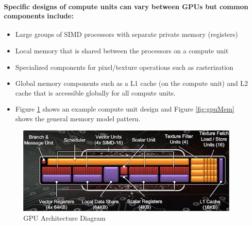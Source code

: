 \documentclass[a4paper,10pt]{article}
\begin{document}
\paragraph{Specific designs of compute units can vary between GPUs but common components include:}
\begin{itemize}
\item Large groups of SIMD processors with separate private memory (registers) 
\item Local memory that is shared between the processors on a compute unit
\item Specialized components for pixel/texture operations such as rasterization
\item Global memory components such as a L1 cache (on the compute unit) and L2 cache that is accessible globally for all compute units.
\item Figure \ref{fig:gpuArch} shows an example compute unit design and Figure \ref{fig:gpuMem} shows the general memory model pattern.
\end{itemize}
	\begin{figure}[H]
	\includegraphics[width=\linewidth,height=\paperheight,keepaspectratio]{gpuArch.jpg}
	\caption{GPU Architecture Diagram}
	\label{fig:gpuArch}
	\end{figure}
	
\end{document}
